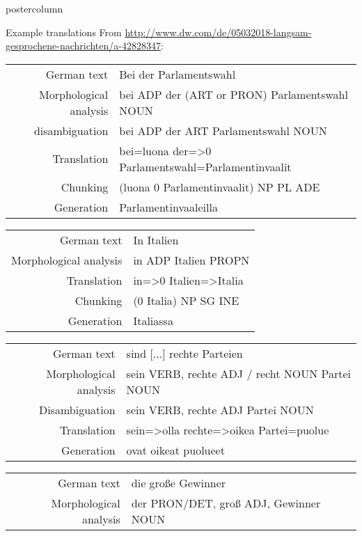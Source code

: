 \documentclass[final,hyperref={pdfpagelabels}]{beamer}
\begin{document}
\begin{frame}
\begin{columns}
\begin{column}{.49\textwidth}
\begin{beamercolorbox}[center,wd=\textwidth]{postercolumn}
\begin{minipage}[T]{.95\textwidth}
{        \begin{block}{Example translations}
            From \url{http://www.dw.com/de/05032018-langsam-gesprochene-nachrichten/a-42828347}:
            \begin{tabular}{|r|l|}
                \hline
                German text & Bei der Parlamentswahl \\
                Morphological analysis & bei ADP der (ART or PRON) Parlamentswahl NOUN \\
                disambiguation & bei ADP der ART Parlamentswahl NOUN\\
                Translation & bei=luona der=>0 Parlamentswahl=Parlamentinvaalit \\
                Chunking & (luona 0 Parlamentinvaalit) NP PL ADE \\
                Generation & Parlamentinvaaleilla \\
                \hline
            \end{tabular}
            \begin{tabular}{|r|l|}
                \hline
                German text & In Italien \\
                Morphological analysis & in ADP Italien PROPN \\
                Translation & in=>0 Italien=>Italia \\
                Chunking & (0 Italia) NP SG INE \\
                Generation & Italiassa \\
                \hline
            \end{tabular}
            \begin{tabular}{|r|l|}
                \hline
                German text & sind [...] rechte Parteien \\
                Morphological analysis &  sein VERB, rechte ADJ / recht NOUN Partei NOUN\\
                Disambiguation &  sein VERB, rechte ADJ Partei NOUN\\
                Translation & sein=>olla rechte=>oikea Partei=puolue \\
                Generation & ovat oikeat puolueet \\
                \hline
            \end{tabular}
            \begin{tabular}{|r|l|}
                \hline
                German text & die große Gewinner \\
                Morphological analysis &  der PRON/DET, groß ADJ, Gewinner NOUN\\

\end{tabular}
\end{block}}
\end{minipage}
\end{beamercolorbox}
\end{column}
\end{columns}
\end{frame}
\end{document}

